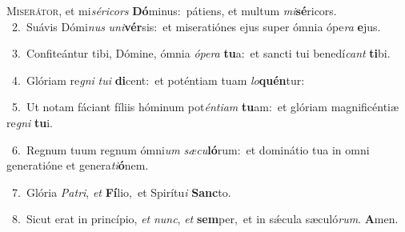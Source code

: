 \lettrine{\initial\textcolor{\initialcolor}{M}}{iserátor,} et mi\-\textit{sé}\-\textit{ri}\textit{cors} \textbf{Dó}\-minus:~\star pátiens, et multum \textit{mi}\-\textbf{sé}ricors.\\
{\numbfont\textcolor{\numbcolor}{~2.}}~Suávis Dómi\textit{nus} \textit{u}\-\textit{ni}\textbf{vér}sis:~\star et miseratiónes ejus super ómnia ópe\textit{ra} \textbf{e}\-jus.\par
{\numbfont\textcolor{\numbcolor}{~3.}}~Confiteántur tibi, Dómine, ómnia \textit{ó}\-\textit{pe}\textit{ra} \textbf{tu}\-a:~\star et sancti tui benedí\textit{cant} \textbf{ti}\-bi.\par
{\numbfont\textcolor{\numbcolor}{~4.}}~Glóriam re\textit{gni} \textit{tu}\-\textit{i} \textbf{di}\-cent:~\star et poténtiam tuam \textit{lo}\-\textbf{quén}tur:\par
{\numbfont\textcolor{\numbcolor}{~5.}}~Ut notam fáciant fíliis hóminum pot\-\textit{én}\-\textit{ti}\textit{am} \textbf{tu}\-am:~\star et glóriam magnificéntiæ re\textit{gni} \textbf{tu}\-i.\par
{\numbfont\textcolor{\numbcolor}{~6.}}~Regnum tuum regnum ómni\textit{um} \textit{sæ}\-\textit{cu}\textbf{ló}rum:~\star et dominátio tua in omni generatióne et genera\-\textit{ti}\-\textbf{ó}nem.\par
{\numbfont\textcolor{\numbcolor}{~7.}}~Glória \textit{Pa}\-\textit{tri}, \textit{et} \textbf{Fí}\-lio,~\star et Spirítu\textit{i} \textbf{Sanc}\-to.\par
{\numbfont\textcolor{\numbcolor}{~8.}}~Sicut erat in princípio, \textit{et} \textit{nunc}\-, \textit{et} \textbf{sem}\-per,~\star et in sǽcula sæculó\-\textit{rum}\-. \textbf{A}\-men.\par
